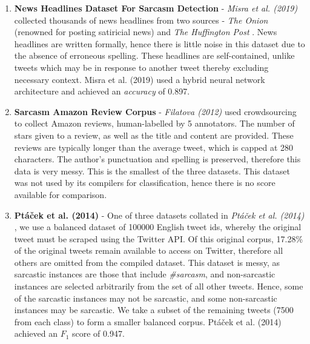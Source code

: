 \documentclass[12pt,a4paper]{article}
\begin{document}
\begin{enumerate}[leftmargin=0cm]
	\item \textbf{News Headlines Dataset For Sarcasm Detection} - \textit{Misra et al. (2019)} \cite{misra2019sarcasm} collected thousands of news headlines from two sources - \textit{The Onion} \footnotemark[3] (renowned for posting satiricial news) and \textit{The Huffington Post} \footnotemark[4]. News headlines are written formally, hence there is little noise in this dataset due to the absence of erroneous spelling. These headlines are self-contained, unlike tweets which may be in response to another tweet thereby excluding necessary context. Misra et al. (2019) \cite{misra2019sarcasm} used a hybrid neural network architecture and achieved an \textit{accuracy} of 0.897.
	
	\item \textbf{Sarcasm Amazon Review Corpus} - \textit{Filatova (2012)} \cite{filatova2012irony} used crowdsourcing to collect Amazon reviews, human-labelled by 5 annotators. The number of stars given to a review, as well as the title and content are provided. These reviews are typically longer than the average tweet, which is capped at 280 characters. The author's punctuation and spelling is preserved, therefore this data is very messy. This is the smallest of the three datasets. This dataset was not used by its compilers for classification, hence there is no score available for comparison.
	
	\item \textbf{Pt\'a\v{c}ek et al. (2014)} - One of three datasets collated in \textit{Pt\'a\v{c}ek et al. (2014)} \cite{ptavcek2014sarcasm}, we use a balanced dataset of 100000 English tweet ids, whereby the original tweet must be scraped using the Twitter API. Of this original corpus, 17.28\% of the original tweets remain available to access on Twitter, therefore all others are omitted from the compiled dataset. This dataset is messy, as sarcastic instances are those that include \textit{\#sarcasm}, and non-sarcastic instances are selected arbitrarily from the set of all other tweets. Hence, some of the sarcastic instances may not be sarcastic, and some non-sarcastic instances may be sarcastic. We take a subset of the remaining tweets (7500 from each class) to form a smaller balanced corpus. Pt\'a\v{c}ek et al. (2014) \cite{ptavcek2014sarcasm} achieved an $F_{1}$ score of 0.947.
\end{enumerate}
\end{document}
